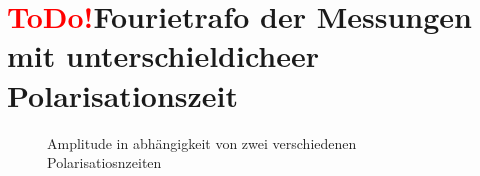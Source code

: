 \section{\textcolor{red}{ToDo!}Fourietrafo der Messungen mit unterschieldicheer Polarisationszeit}
\begin{figure}[H]
    \centering
    
    \caption{Amplitude in abhängigkeit von zwei verschiedenen Polarisatiosnzeiten}
\end{figure}